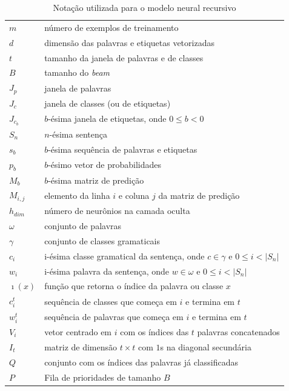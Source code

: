 \begin{table}[!htb]
\caption{Notação utilizada para o modelo neural recursivo} \label{tab:variaveisdesenvolvimento}
\begin{center}
\begin{tabular}{P{1cm}m{13.0cm}}
  \toprule
  $m$   & número de exemplos de treinamento \\
  $d$		& dimensão das palavras e etiquetas vetorizadas \\
  $t$   & tamanho da janela de palavras e de classes \\
  $B$   & tamanho do \textit{beam} \\
  $J_p$ & janela de palavras \\
  $J_c$ & janela de classes (ou de etiquetas) \\
  $J_{c_b}$ & $b$-ésima janela de etiquetas, onde $0 \leq b < 0$ \\
  $S_n$  & $n$-ésima sentença \\
  $s_b$ & $b$-ésima sequência de palavras e etiquetas \\
  $p_b$ & $b$-ésimo vetor de probabilidades \\
  $M_b$ & $b$-ésima matriz de predição \\
  $M_{i,j}$ & elemento da linha $i$ e coluna $j$ da matriz de predição \\
  $h_{dim}$ & número de neurônios na camada oculta \\
  $\omega$	& conjunto de palavras \\
  $\gamma$  & conjunto de classes gramaticais \\
  $c_i$   & i-ésima classe gramatical da sentença, onde $c \in \gamma$ e $0 \leq i < |S_n|$ \\ 
  $w_i$   & i-ésima palavra da sentença, onde $w \in \omega$ e $0 \leq i < |S_n|$ \\
  $\imath(x)$  & função que retorna o índice da palavra ou classe $x$ \\
  $c_i^t$  & sequência de classes que começa em $i$ e termina em $t$ \\
  $w_i^t$  & sequência de palavras que começa em $i$ e termina em $t$ \\
  $V_i$		& vetor centrado em $i$ com os índices das $t$ palavras concatenados \\
  $I_t$ & matriz de dimensão $t \times t$ com $1$s na diagonal secundária \\
  $Q$	&	conjunto com os índices das palavras já classificadas \\
  $P$ & Fila de prioridades de tamanho $B$ \\
  \bottomrule
\end{tabular}
\end{center}
\end{table}

